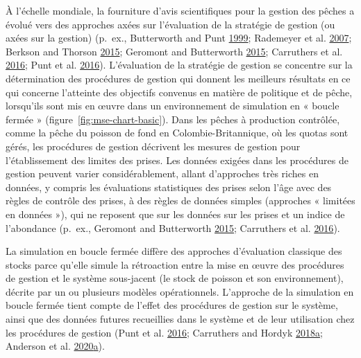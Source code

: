\documentclass[11pt]{book}
\begin{document}
À l'échelle mondiale, la fourniture d'avis scientifiques pour la gestion des pêches a évolué vers des approches axées sur l'évaluation de la stratégie de gestion (ou axées sur la gestion) (p.~ex., Butterworth and Punt \protect\hyperlink{ref-butterworth1999}{1999}; Rademeyer et al. \protect\hyperlink{ref-rademeyer2007}{2007}; Berkson and Thorson \protect\hyperlink{ref-berkson2015}{2015}; Geromont and Butterworth \protect\hyperlink{ref-geromont2015}{2015}; Carruthers et al. \protect\hyperlink{ref-carruthers2016}{2016}; Punt et al. \protect\hyperlink{ref-punt2016}{2016}). L'évaluation de la stratégie de gestion se concentre sur la détermination des procédures de gestion qui donnent les meilleurs résultats en ce qui concerne l'atteinte des objectifs convenus en matière de politique et de pêche, lorsqu'ils sont mis en œuvre dans un environnement de simulation en « boucle fermée » (figure~\ref{fig:mse-chart-basic}). Dans les pêches à production contrôlée, comme la pêche du poisson de fond en Colombie-Britannique, où les quotas sont gérés, les procédures de gestion décrivent les mesures de gestion pour l'établissement des limites des prises. Les données exigées dans les procédures de gestion peuvent varier considérablement, allant d'approches très riches en données, y compris les évaluations statistiques des prises selon l'âge avec des règles de contrôle des prises, à des règles de données simples (approches « limitées en données »), qui ne reposent que sur les données sur les prises et un indice de l'abondance (p.~ex., Geromont and Butterworth \protect\hyperlink{ref-geromont2015}{2015}; Carruthers et al. \protect\hyperlink{ref-carruthers2016}{2016}).

La simulation en boucle fermée diffère des approches d'évaluation classique des stocks parce qu'elle simule la rétroaction entre la mise en œuvre des procédures de gestion et le système sous-jacent (le stock de poisson et son environnement), décrite par un ou plusieurs modèles opérationnels. L'approche de la simulation en boucle fermée tient compte de l'effet des procédures de gestion sur le système, ainsi que des données futures recueillies dans le système et de leur utilisation chez les procédures de gestion (Punt et al. \protect\hyperlink{ref-punt2016}{2016}; Carruthers and Hordyk \protect\hyperlink{ref-carruthers2018}{2018}\protect\hyperlink{ref-carruthers2018}{a}; Anderson et al. \protect\hyperlink{ref-anderson2020gfmp}{2020}\protect\hyperlink{ref-anderson2020gfmp}{a}).
\end{document}
